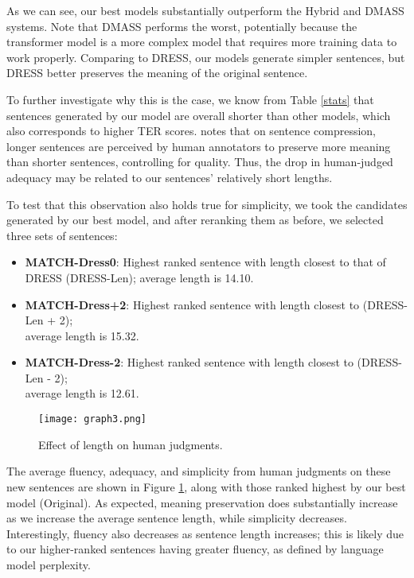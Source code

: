 \documentclass[11pt,a4paper]{article}
\begin{document}
As we can see, our best models substantially outperform the Hybrid and DMASS systems. Note that DMASS performs the worst, potentially because the transformer model is a more complex model that requires more training data to work properly. Comparing to DRESS, our models generate simpler sentences, but DRESS better preserves the meaning of the original sentence.

To further investigate why this is the case, we know from Table \ref{stats} that sentences generated by our model are overall shorter than other models, which also corresponds to higher TER scores.  notes that on sentence compression, longer sentences are perceived by human annotators to preserve more meaning than shorter sentences, controlling for quality. Thus, the drop in human-judged adequacy may be related to our sentences' relatively short lengths.

To test that this observation also holds true for simplicity, we took the candidates generated by our best model, and after reranking them as before, we selected three sets of sentences:

\begin{itemize}
    \item \textbf{MATCH-Dress0}: Highest ranked sentence with length closest to that of DRESS (DRESS-Len); average length is 14.10.
    \item \textbf{MATCH-Dress+2}: Highest ranked sentence with length closest to (DRESS-Len + 2); \\ average length is 15.32.
    \item \textbf{MATCH-Dress-2}: Highest ranked sentence with length closest to (DRESS-Len - 2); \\ average length is 12.61.\\
\end{itemize}

\begin{figure}[bt]
    \centering
\texttt{[image: graph3.png]}
\caption{Effect of length on human judgments.}
\label{length}
\end{figure}

The average fluency, adequacy, and simplicity from human judgments on these new sentences are shown in Figure \ref{length}, along with those ranked highest by our best model (Original). As expected, meaning preservation does substantially increase as we increase the average sentence length, while simplicity decreases. Interestingly, fluency also decreases as sentence length increases; this is likely due to our higher-ranked sentences having greater fluency, as defined by language model perplexity.
\end{document}
